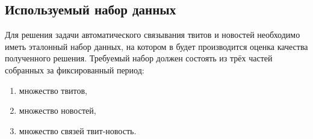 \subsection{Используемый набор данных}
    Для решения задачи автоматического связывания твитов и новостей необходимо иметь эталонный набор данных, на котором в будет производится оценка качества полученного решения.
    Требуемый набор должен состоять из трёх частей собранных за фиксированный период:
    \begin{enumerate}
        \item множество твитов,
        \item множество новостей,
        \item множество связей твит-новость.
    \end{enumerate}



